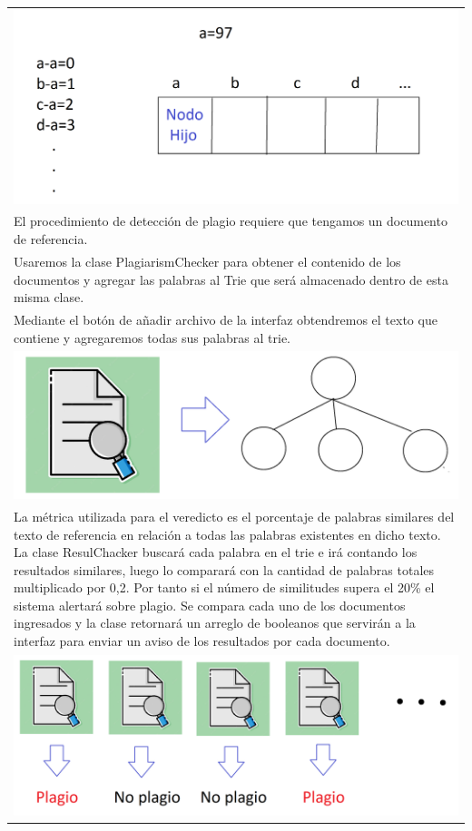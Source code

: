 \documentclass[9pt]{article}
\begin{document}
\begin{longtable}{|p{15cm}|}
		\includegraphics[width=14cm]{img/asignacionLetras.png}\\
		El procedimiento de detección de plagio requiere que tengamos un documento de referencia.\\
		Usaremos la clase PlagiarismChecker para obtener el contenido de los documentos y agregar las palabras al Trie que será almacenado dentro de esta misma clase.\\
		Mediante el botón de añadir archivo de la interfaz obtendremos el texto que contiene y agregaremos todas sus palabras al trie.\\
		\includegraphics[width=14cm]{img/importarTexto.png}\\
		La métrica utilizada para el veredicto es el porcentaje de palabras similares del texto de referencia en relación a todas las palabras existentes en dicho texto.
		La clase ResulChacker buscará cada palabra en el trie e irá contando los resultados similares, luego lo comparará con la cantidad de palabras totales multiplicado por 0,2.
		Por tanto si el número de similitudes supera el 20\% el sistema alertará sobre plagio.
		Se compara cada uno de los documentos ingresados y la clase retornará un arreglo de booleanos que servirán a la interfaz para enviar un aviso de los resultados por cada documento.\\
		\includegraphics[width=14cm]{img/resultadosMultiples.png}\\
		

\end{longtable}
\end{document}
